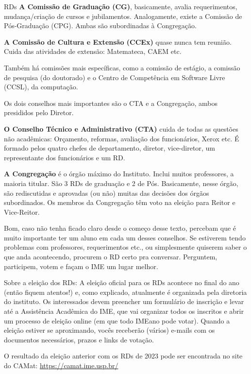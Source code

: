 \begin{subsecao}{RDs}
{\bf A Comissão de Graduação (CG)}, basicamente, avalia requerimentos,
mudança/criação de cursos e jubilamentos. Analogamente, existe a Comissão de
Pós-Graduação (CPG). Ambas são subordinadas à Congregação.

{\bf A Comissão de Cultura e Extensão (CCEx)} quase nunca tem reunião. Cuida
das atividades de extensão: Matemateca, CAEM etc.

Também há comissões mais específicas, como a comissão de estágio, a comissão de
pesquisa (do doutorado) e o Centro de Competência em Software Livre (CCSL), da
computação.

Os dois conselhos mais importantes são o CTA e a Congregação, ambos presididos
pelo Diretor.

{\bf O Conselho Técnico e Administrativo (CTA)} cuida de todas as questões não
acadêmicas: Orçamento, reformas, avaliação dos funcionários, Xerox etc. É
formado pelos quatro chefes de departamento, diretor, vice-diretor, um
representante dos funcionários e um RD.

{\bf A Congregação} é o órgão máximo do Instituto. Inclui muitos professores, a
maioria titular. São 3 RDs de graduação e 2 de Pós. Basicamente,
nesse órgão, são rediscutidas e aprovadas (ou não) muitas das decisões
dos órgãos subordinados. Os membros da Congregação têm voto na eleição para
Reitor e Vice-Reitor.

Bom, caso não tenha ficado claro desde o começo desse texto, percebam que é
muito importante ter um aluno em cada um desses conselhos. Se estiverem tendo
problemas com professores, requerimentos etc., ou simplesmente quiserem saber
o que anda acontecendo, procurem o RD certo pra conversar. Perguntem,
participem, votem e façam o IME um lugar melhor.

Sobre a eleição dos RDs: A eleição oficial para os RDs acontece no final do ano
(então fiquem atentos!) e, como explicado, atualmente é organizada pela diretoria 
do instituto. Os interessados devem preencher um formulário de inscrição e levar 
até a Assistência Acadêmica do IME, que vai organizar todos os inscritos e abrir 
um processo de eleição online (em que todo IMEano pode votar). Quando a eleição
estiver se aproximando, vocês receberão (vários) e-mails com os documentos
necessários, prazos e links de votação.

O resultado da eleição anterior com os RDs de 2023 pode ser encontrada no site
do CAMat:
\url{https://camat.ime.usp.br/}


\end{subsecao}
